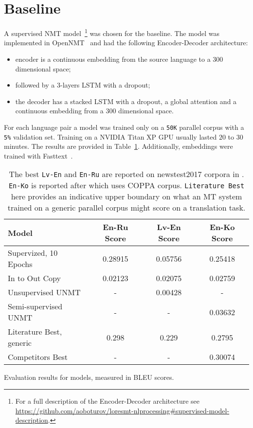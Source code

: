 \documentclass[]{article}
\begin{document}
\section{Baseline}
\label{sect:baseline}

A supervised \ac{NMT} model~\footnote{For a full description of the Encoder-Decoder architecture see \url{https://github.com/aoboturov/loresmt-nlprocessing\#supervised-model-description}.} was chosen for the baseline.
The model was implemented in OpenNMT~\citep{opennmt} and had the following Encoder-Decoder architecture:
\begin{itemize}
\item encoder is a continuous embedding from the source language to a $300$ dimensional space;
\item followed by a $3$-layers LSTM with a dropout;
\item the decoder has a stacked LSTM with a dropout, a global attention \citep{luong2015effective} and a continuous embedding from a $300$ dimensional space.
\end{itemize}

For each language pair a model was trained only on a {\tt 50K} parallel corpus with a {\tt 5\%} validation set.
Training on a NVIDIA Titan XP GPU usually lasted $20$ to $30$ minutes.
The results are provided in Table~\ref{table:results}.
Additionally, embeddings were trained with Fasttext~\citep{bojanowski2016enriching}.

\begin{table}
\begin{center}
\begin{tabular}{ l c c c }
Model & En-Ru Score & Lv-En Score & En-Ko Score \\
\hline
Supervized, 10 Epochs & 0.28915 & 0.05756 & 0.25418 \\
In to Out Copy & 0.02123 & 0.02075 & 0.02759 \\
Unsupervised UNMT & - & 0.00428 & - \\
Semi-supervised UNMT & - & - & 0.03632 \\
Literature Best, generic & 0.298 & 0.229 & 0.2795 \\
Competitors Best & - & - & 0.30074
\end{tabular}
\end{center}
\caption{Evaluation results for models, measured in BLEU scores.}
\caption*{\small
The best {\tt Lv-En} and  {\tt En-Ru} are reported on newstest2017 corpora in \cite{bojar2017findings}.
{\tt En-Ko} is reported after \cite{junczys2016coppa} which uses COPPA corpus.
{\tt Literature Best} here provides an indicative upper boundary on what an \acf{MT} system trained on a generic parallel corpus might score on a translation task.
}
\label{table:results}
\end{table}
\end{document}
